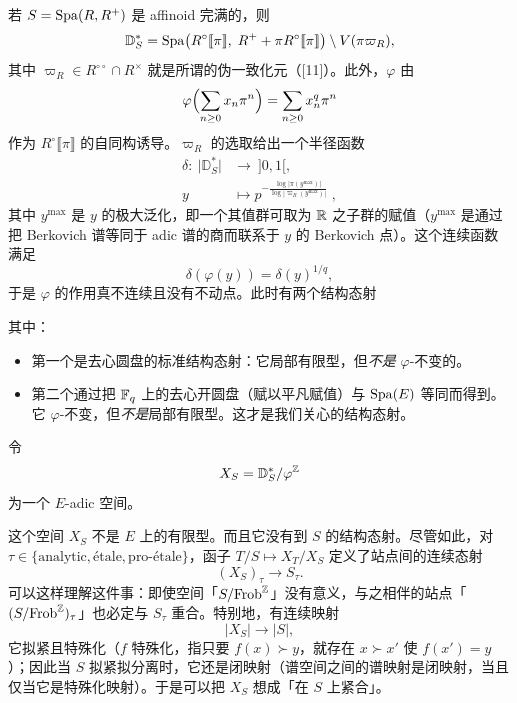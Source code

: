 若 $S=\mathrm{Spa}(R,R^+)$ 是 affinoid 完满的，则
\[
  \mathbb{D}^*_S=\mathrm{Spa}\bigl(R^\circ\llbracket\pi\rrbracket,\;R^++\pi R^\circ\llbracket\pi\rrbracket\bigr)\setminus V(\pi\varpi_R),
\]
其中 $\varpi_R\in R^{\circ\circ}\cap R^\times$ 就是所谓的伪一致化元（[11]）。此外，$\varphi$ 由
\[
  \varphi\Bigl(\sum_{n\ge0}x_n\pi^n\Bigr)=\sum_{n\ge0}x_n^q\pi^n
\]
作为 $R^\circ\llbracket\pi\rrbracket$ 的自同构诱导。$\varpi_R$ 的选取给出一个半径函数
\begin{equation}\label{eq:1.1}
\begin{aligned}
  \delta:\ \bigl|\mathbb{D}^*_S\bigr| &\longrightarrow\ ]0,1[,\\
  y &\longmapsto p^{-\frac{\log|\pi(y^{\max})|}{\log|\varpi_R(y^{\max})|}}\;,
\end{aligned}
\end{equation}
其中 $y^{\max}$ 是 $y$ 的极大泛化，即一个其值群可取为 $\mathbb{R}$ 之子群的赋值（$y^{\max}$ 是通过把 Berkovich 谱等同于 adic 谱的商而联系于 $y$ 的 Berkovich 点）。这个连续函数满足
\[
  \delta(\varphi(y))=\delta(y)^{1/q},
\]
于是 $\varphi$ 的作用真不连续且没有不动点。此时有两个结构态射
\begin{center}
\end{center}
其中：

\begin{itemize}
  \item 第一个是去心圆盘的标准结构态射：它局部有限型，但\emph{不是} $\varphi$-不变的。
  \item {}第二个通过把 $\mathbb{F}_q$ 上的去心开圆盘（赋以平凡赋值）与 $\mathrm{Spa}(E)$ 等同而得到。它 $\varphi$-不变，但\emph{不是}局部有限型。这才是我们关心的结构态射。
\end{itemize}

\begin{definition}\label{def:1.2}
令
\[
  X_S=\mathbb{D}^*_S/\varphi^{\mathbb{Z}}
\]
为一个 $E$-adic 空间。
\end{definition}

这个空间 $X_S$ 不是 $E$ 上的有限型。而且它没有到 $S$ 的结构态射。尽管如此，对 $\tau\in\{\text{analytic},\text{étale},\text{pro-étale}\}$，函子 $T/S\mapsto X_T/X_S$ 定义了站点间的连续态射
\[
  (X_S)_\tau\longrightarrow S_\tau.
\]
可以这样理解这件事：即使空间「$S/\mathrm{Frob}^{\mathbb{Z}}$」没有意义，与之相伴的站点「$(S/\mathrm{Frob}^{\mathbb{Z}})_\tau$」也必定与 $S_\tau$ 重合。特别地，有连续映射
\[
  |X_S|\longrightarrow|S|,
\]
它拟紧且特殊化（$f$ 特殊化，指只要 $f(x)\succ y$，就存在 $x\succ x'$ 使 $f(x')=y$）；因此当 $S$ 拟紧拟分离时，它还是闭映射（谱空间之间的谱映射是闭映射，当且仅当它是特殊化映射）。于是可以把 $X_S$ 想成「在 $S$ 上紧合」。


